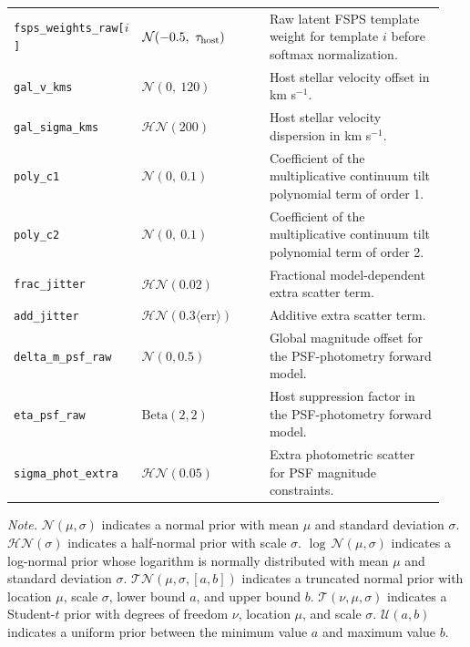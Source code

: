 \begin{table}[ht]
\begin{tabular}{p{0.22\linewidth} p{0.30\linewidth} p{0.42\linewidth}}
\texttt{fsps\_weights\_raw[$i$]} & $\mathcal{N}(-0.5,\ \tau_{\rm host})$ & Raw latent FSPS template weight for template $i$ before softmax normalization. \\
\texttt{gal\_v\_kms} & $\mathcal{N}(0,\ 120)$ & Host stellar velocity offset in km s$^{-1}$. \\
\texttt{gal\_sigma\_kms} & $\mathcal{HN}(200)$ & Host stellar velocity dispersion in km s$^{-1}$. \\
\texttt{poly\_c1} & $\mathcal{N}(0,\ 0.1)$ & Coefficient of the multiplicative continuum tilt polynomial term of order 1. \\
\texttt{poly\_c2} & $\mathcal{N}(0,\ 0.1)$ & Coefficient of the multiplicative continuum tilt polynomial term of order 2. \\
\texttt{frac\_jitter} & $\mathcal{HN}(0.02)$ & Fractional model-dependent extra scatter term. \\
\texttt{add\_jitter} & $\mathcal{HN}(0.3\langle\mathrm{err}\rangle)$ & Additive extra scatter term. \\
\texttt{delta\_m\_psf\_raw} & $\mathcal{N}(0, 0.5)$ & Global magnitude offset for the PSF-photometry forward model. \\
\texttt{eta\_psf\_raw} & $\mathrm{Beta}(2, 2)$ & Host suppression factor in the PSF-photometry forward model. \\
\texttt{sigma\_phot\_extra} & $\mathcal{HN}(0.05)$ & Extra photometric scatter for PSF magnitude constraints. \\
\hline
\end{tabular}
\vspace{0.4em}
\begin{minipage}{0.94\linewidth}
\footnotesize
\textit{Note.} $\mathcal{N}(\mu,\sigma)$ indicates a normal prior with mean $\mu$ and standard deviation $\sigma$. $\mathcal{HN}(\sigma)$ indicates a half-normal prior with scale $\sigma$. $\log\,\mathcal{N}(\mu,\sigma)$ indicates a log-normal prior whose logarithm is normally distributed with mean $\mu$ and standard deviation $\sigma$. $\mathcal{TN}(\mu,\sigma,[a,b])$ indicates a truncated normal prior with location $\mu$, scale $\sigma$, lower bound $a$, and upper bound $b$. $\mathcal{T}(\nu,\mu,\sigma)$ indicates a Student-$t$ prior with degrees of freedom $\nu$, location $\mu$, and scale $\sigma$. $\mathcal{U}(a,b)$ indicates a uniform prior between the minimum value $a$ and maximum value $b$.
\end{minipage}
\end{table}

